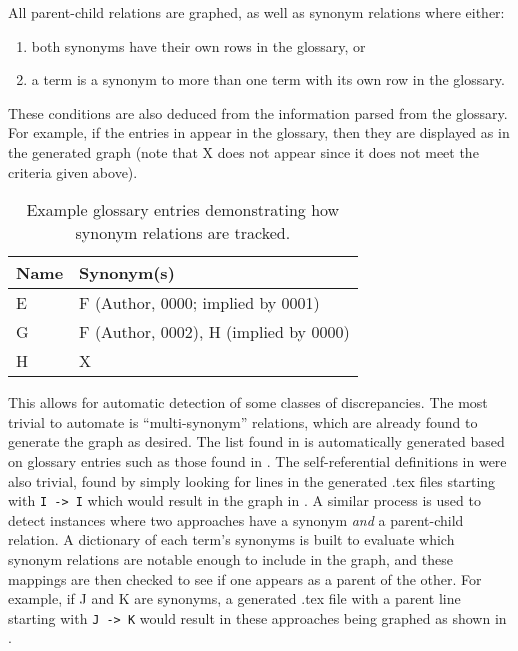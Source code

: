 {        \ExampleGraph{}

        \newpage\fi
    All parent-child relations are graphed, as well as synonym relations where either:
    \begin{enumerate}
        \item both synonyms have their own rows in the glossary, or
        \item a term is a synonym to more than one term with its own row in the
              glossary.
    \end{enumerate}
    \ifnotpaper These conditions are also deduced from the information parsed
        from the glossary. For example, if the entries in 
        appear in the glossary, then they are displayed as 
        in the generated graph (note that X does not appear since it does not
        meet the criteria given above).

        \begin{table}[hbtp!]
            \centering
            \begin{tabular}{ll} \hline
                Name & Synonym(s)                            \\ \hline
                E    & F (Author, 0000; implied by 0001)     \\
                G    & F (Author, 0002), H (implied by 0000) \\
                H    & X                                     \\ \hline
            \end{tabular}
            \caption{Example glossary entries demonstrating how synonym relations are tracked.}
            \label{tab:synExampleGlossary}
        \end{table}

        This allows for automatic detection of some classes of discrepancies. The
        most trivial to automate is ``multi-synonym'' relations, which are already
        found to generate the graph as desired. The list found in 
        is automatically generated based on glossary entries such as those found
        in . The self-referential definitions in
         were also trivial, found by simply looking for lines in
        the generated .tex files starting with \texttt{I -> I} which would
        result in the graph in . A similar process
        is used to detect instances where two approaches have a synonym
        \emph{and} a parent-child relation. A dictionary of each term's
        synonyms is built to evaluate which synonym relations are notable
        enough to include in the graph, and these mappings are then checked to
        see if one appears as a parent of the other. For example, if J and K
        are synonyms, a generated .tex file with a parent line starting with
        \texttt{J -> K} would result in these approaches being graphed as shown
        in .

}
